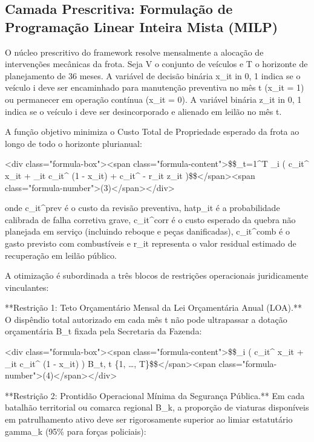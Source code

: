 \documentclass[12pt,a4paper]{article}
\begin{document}
\subsection{Camada Prescritiva: Formulação de Programação Linear Inteira Mista (MILP)}

O núcleo prescritivo do framework resolve mensalmente a alocação de intervenções mecânicas da frota. Seja V o conjunto de veículos e T o horizonte de planejamento de 36 meses. A variável de decisão binária x\_{it} in {0, 1} indica se o veículo i deve ser encaminhado para manutenção preventiva no mês t (x\_{it} = 1) ou permanecer em operação contínua (x\_{it} = 0). A variável binária z\_{it} in {0, 1} indica se o veículo i deve ser desincorporado e alienado em leilão no mês t.

A função objetivo minimiza o Custo Total de Propriedade esperado da frota ao longo de todo o horizonte plurianual:

<div class="formula-box"><span class="formula-content">\$\$\min \sum\_{t=1}^{T} \sum\_{i \in {}} \left( c\_{it}^{} x\_{it} + \_{it} c\_{it}^{} (1 - x\_{it}) + c\_{it}^{} - r\_{it} z\_{it} \right)\$\$</span><span class="formula-number">(3)</span></div>

onde c\_{it}^{prev} é o custo da revisão preventiva, hat{p}\_{it} é a probabilidade calibrada de falha corretiva grave, c\_{it}^{corr} é o custo esperado da quebra não planejada em serviço (incluindo reboque e peças danificadas), c\_{it}^{comb} é o gasto previsto com combustíveis e r\_{it} representa o valor residual estimado de recuperação em leilão público.

A otimização é subordinada a três blocos de restrições operacionais juridicamente vinculantes:

**Restrição 1: Teto Orçamentário Mensal da Lei Orçamentária Anual (LOA).** O dispêndio total autorizado em cada mês t não pode ultrapassar a dotação orçamentária B\_t fixada pela Secretaria da Fazenda:

<div class="formula-box"><span class="formula-content">\$\$\sum\_{i \in {}} \left( c\_{it}^{} x\_{it} + \_{it} c\_{it}^{} (1 - x\_{it}) \right) \le B\_t, \quad \forall t \in \{1, \dots, T\}\$\$</span><span class="formula-number">(4)</span></div>

**Restrição 2: Prontidão Operacional Mínima da Segurança Pública.** Em cada batalhão territorial ou comarca regional B\_k, a proporção de viaturas disponíveis em patrulhamento ativo deve ser rigorosamente superior ao limiar estatutário gamma\_k (95\% para forças policiais):
\end{document}
